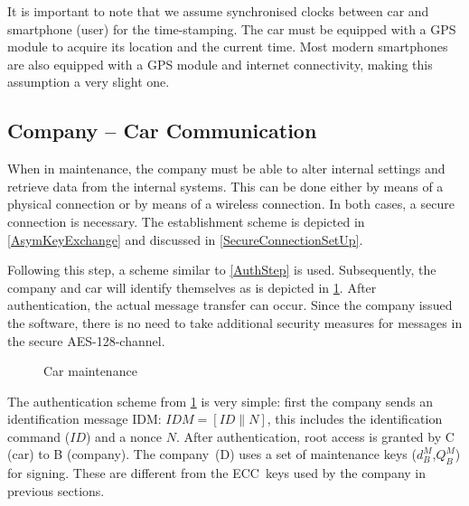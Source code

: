 It is important to note that we assume synchronised clocks between car and smartphone (user) for the time-stamping. The car must be equipped with a GPS module to acquire its location and the current time. Most modern smartphones are also equipped with a GPS module and internet connectivity, making this assumption a very slight one.


\subsection{Company -- Car Communication}

When in maintenance, the company must be able to alter internal settings and retrieve data from the internal systems. This can be done either by means of a physical connection or by means of a wireless connection. In both cases, a secure connection is necessary. The establishment scheme is depicted in \cref{AsymKeyExchange} and discussed in \cref{SecureConnectionSetUp}.

Following this step, a scheme similar to \cref{AuthStep} is used. Subsequently, the company and car will identify themselves as is depicted in \cref{CarMaintenance}. After authentication, the actual message transfer can occur. Since the company issued the software, there is no need to take additional security measures for messages in the secure AES-128-channel.

\begin{figure}[!ht]
  \renewcommand{\Bx}{8}
  \setcounter{CC}{0}
  \centering
  \caption{Car maintenance}
  \label{CarMaintenance}
\end{figure}

The authentication scheme from \cref{CarMaintenance} is very simple: first the company sends an identification message IDM: $IDM = [ID\parallel N]$, this includes the identification command ($ID$) and a nonce $N$. After authentication, root access is granted by C (car) to B (company).
The company~(D) uses a set of maintenance keys ($d_B^M$,$Q_B^M$) for signing. These are different from the ECC~keys used by the company in previous sections.

